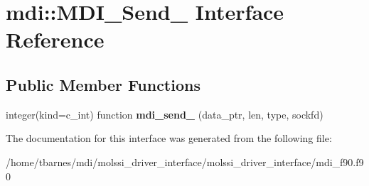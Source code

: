 \hypertarget{interfacemdi_1_1MDI__Send__}{\section{mdi\-:\-:M\-D\-I\-\_\-\-Send\-\_\- Interface Reference}
\label{interfacemdi_1_1MDI__Send__}
}
\subsection*{Public Member Functions}
\begin{DoxyCompactItemize}
\item 
\hypertarget{interfacemdi_1_1MDI__Send___a696dd7ff266143903df4669aca92d32f}{integer(kind=c\-\_\-int) function {\bfseries mdi\-\_\-send\-\_\-} (data\-\_\-ptr, len, type, sockfd)}\label{interfacemdi_1_1MDI__Send___a696dd7ff266143903df4669aca92d32f}

\end{DoxyCompactItemize}


The documentation for this interface was generated from the following file\-:\begin{DoxyCompactItemize}
\item 
/home/tbarnes/mdi/molssi\-\_\-driver\-\_\-interface/molssi\-\_\-driver\-\_\-interface/mdi\-\_\-f90.\-f90\end{DoxyCompactItemize}
